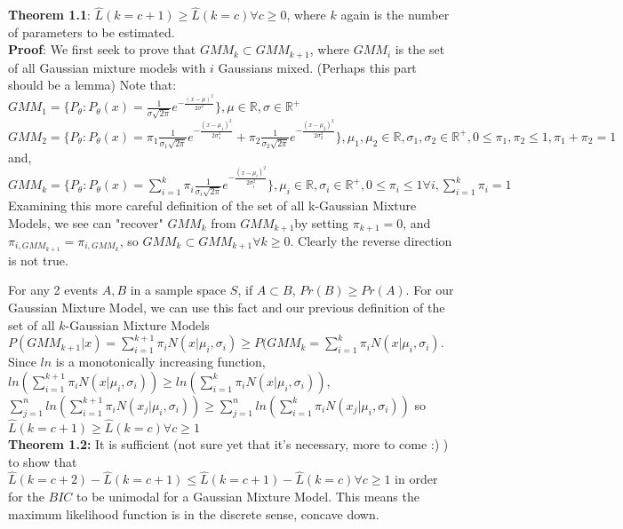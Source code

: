 \documentclass{article}
\begin{document}
\textbf{Theorem 1.1}: \(\hat{L}(k = c+1) \geq \hat{L}(k = c) \forall c\geq 0\), where \(k\) again is the number of parameters to be estimated.\\
\textbf{Proof}:
We first seek to prove that \(GMM_k \subset GMM_{k+1}\), where  \(GMM_i\) is the set of all Gaussian mixture models with \(i\) Gaussians mixed. (Perhaps this part should be a lemma) Note that:\\
\(GMM_1  = \{P_{\theta} : P_{\theta}(x) = \frac{1}{\sigma \sqrt{2\pi}} e^{ - \frac{(x - \mu)^2}{2\sigma^2}} \}, \mu \in \mathbb{R}, \sigma \in \mathbb{R}^+\)\\
\(GMM_2 = \{P_{\theta} : P_{\theta}(x) = \pi_1 \frac{1}{\sigma_1 \sqrt{2\pi}} e^{ - \frac{(x - \mu_1)^2}{2\sigma_1^2}} + \pi_2 \frac{1}{\sigma_2 \sqrt{2\pi}} e^{ - \frac{(x - \mu_2)^2}{2\sigma_2^2}} \}, \mu_1, \mu_2 \in \mathbb{R}, \sigma_1, \sigma_2 \in \mathbb{R}^+ , 0 \leq \pi_1, \pi_2 \leq 1, \pi_1 + \pi_2 = 1\)\\
and, 
\(GMM_k = \{P_{\theta} : P_{\theta}(x) = \sum_{i=1}^k \pi_i \frac{1}{\sigma_i \sqrt{2\pi}} e^{ - \frac{(x - \mu_i)^2}{2\sigma_i^2}}  \}, \mu_i \in \mathbb{R}, \sigma_i \in \mathbb{R}^+ , 0 \leq \pi_i \leq 1\forall i, \sum_{i=1}^k \pi_i = 1\)\\

Examining this more careful definition of the set of all k-Gaussian Mixture Models, we see can "recover" \(GMM_k\) from \(GMM_{k+1}\)by setting \(\pi_{k+1} = 0\), and \(\pi_{i, GMM_{k+1}} = \pi_{i, GMM_k}\), so \(GMM_k \subset GMM_{k+1} \forall k \geq 0\). Clearly the reverse direction is not true.

For any 2 events \(A, B\) in a sample space \(S\), if \(A \subset B\), \(Pr(B) \geq Pr(A)\). For our Gaussian Mixture Model, we can use this fact and our previous definition of the set of all \(k\)-Gaussian Mixture Models \(P(GMM_{k+1} | x) =  \sum_{i=1}^{k+1} \pi_i N(x | \mu_i, \sigma_i) \geq P(GMM_{k}  =  \sum_{i=1}^k \pi_i N(x | \mu_i, \sigma_i)\). Since \(ln\) is a monotonically increasing function,  \(ln(\sum_{i=1}^{k+1} \pi_i N(x | \mu_i, \sigma_i)) \geq  ln(\sum_{i=1}^k \pi_i N(x | \mu_i, \sigma_i))\), \\
 \( \sum_{j=1}^n ln (\sum_{i=1}^{k+1} \pi_i N(x_j | \mu_i, \sigma_i) )\geq  \sum_{j=1}^n ln (\sum_{i=1}^{k} \pi_i N(x_j | \mu_i, \sigma_i) )\) so \(\hat{L}(k = c+1) \geq \hat{L}(k = c) \forall c\geq 1 \)\\
 
 \textbf{Theorem 1.2:} It is sufficient (not sure yet that it's necessary, more to come :) ) to show that \(\hat{L}(k = c+2) - \hat{L}(k = c +1) \leq \hat{L}(k = c+1) - \hat{L}(k = c) \forall c \geq 1\) in order for the \(BIC\) to be unimodal for a Gaussian Mixture Model. This means the maximum likelihood function is in the discrete sense, concave down. \\
\end{document}
